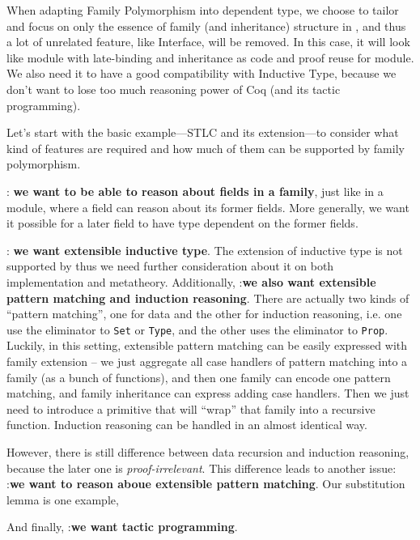 When adapting Family Polymorphism into dependent type, we choose to tailor and focus on only the essence of family (and inheritance) structure in \citet{zm2017}, and thus a lot of unrelated feature, like Interface, will be removed. In this case, it will look like module with late-binding and inheritance as code and proof reuse for module. We also need it to have a good compatibility with Inductive Type, because we don't want to lose too much reasoning power of Coq (and its tactic programming). 

Let's start with the basic example---STLC and its extension---to consider what kind of features are required and how much of them can be supported by family polymorphism.




:\textbf{ we want to be able to reason about fields in a family}, just like in a module, where a field can reason about its former fields. More generally, we want it possible for a later field to have type dependent on the former fields.

:\textbf{ we want extensible inductive type}. The extension of inductive type is not supported by \citet{zm2017} thus we need further consideration about it on both implementation and metatheory. Additionally, :\textbf{we also want extensible pattern matching and induction reasoning}. There are actually two kinds of ``pattern matching'', one for data and the other for induction reasoning, i.e. one use the eliminator to \texttt{Set} or \texttt{Type}, and the other uses the eliminator to \texttt{Prop}. Luckily, in this setting, extensible pattern matching can be easily expressed with family extension -- we just aggregate all case handlers of pattern matching into a family (as a bunch of functions), and then one family can encode one pattern matching, and family inheritance can express adding case handlers. Then we just need to introduce a primitive that will ``wrap'' that family into a recursive function. Induction reasoning can be handled in an almost identical way. 

However, there is still difference between data recursion and induction reasoning, because the later one is \textit{proof-irrelevant}. This difference leads to another issue: :\textbf{we want to reason aboue extensible pattern matching}. Our substitution lemma is one example, 



And finally, :\textbf{we want tactic programming}. 


